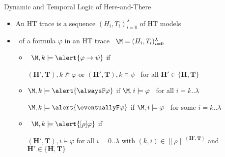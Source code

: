 \begin{frame}{Dynamic and Temporal Logic of Here-and-There}
  \begin{itemize}
  \item<2->  An HT trace is a sequence $(H_i,T_i)_{i=0}^{\lambda}$ of HT models
    \medskip
  \item<3->  \ of a formula $\varphi$ in an HT trace \ $\M=(H_i,T_i)_{i=0}^{\lambda}$
    \smallskip
    \begin{itemize}\normalsize
    \item<4-> 
      \
      $\M, k \models \alert{\varphi \to \psi}$
      \pause[5]
      \small
      if
      \smallskip

      $( \mathbf{H}', \mathbf{T} ), k \not \models \varphi$
      or
      $( \mathbf{H}', \mathbf{T} ), k \models  \psi$ \ for all $\mathbf{H'} \in \{ \mathbf{H}, \mathbf{T} \}$
      \medskip

    \item<6-> 
      \small

      \smallskip
      $\M, k \models \alert{\alwaysF\varphi}$
      if
      $\M, i \models \varphi$ \ for all $i=k..\lambda$

      \smallskip
      $\M, k \models \alert{\eventuallyF\varphi}$
      if
      $\M, i \models \varphi$ \ for some $i=k..\lambda$
      \medskip

    \item<7-> 
      \
      $\M, k \models \alert{[\rho]\varphi}$
      \pause[8]
      if\smallskip

      \small
      $( \mathbf{H'}, \mathbf{T} ),i \models \varphi$
      for all $i=0..\lambda$ with $(k,i) \in {\parallel\rho\parallel}^{( \mathbf{H'}, \mathbf{T} )}$ and $\mathbf{H'} \in \{ \mathbf{H}, \mathbf{T} \}$
    \end{itemize}
  \end{itemize}
\end{frame}
